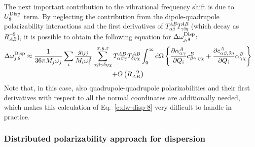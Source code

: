 \documentclass[a4paper,titlepage,twoside,fleqn,12pt]{book}
\newcommand{\fderiv}[2]{\ensuremath{
\frac{\partial #1}{\partial #2}}}
\begin{document}
\begin{refsection}
The next important contribution to the vibrational frequency 
shift is due to $U_{8}^{\rm Disp}$ term. By neglecting the 
contribution from the dipole\hyp{}quadrupole polarizability 
interactions and the first derivatives of $T^{AB}_{\alpha\beta}T^{AB}_{\gamma\delta\eta}$ 
(which decay as $R^{-9}_{AB}$), it is possible to obtain 
the following equation for $\Delta \omega_{j,8}^{\rm Disp}$: 
%
\begin{multline} \label{e:dw-disp-8}
 \Delta\omega_{j,8}^{\rm Disp} \approx 
\frac{1}{36\pi M_j\omega_j}\sum_i \frac{g_{ijj}}{M_i\omega_i^2} 
\sum_{\alpha\beta\gamma\delta\eta\chi}^{x,y,z}   
T^{AB}_{\alpha\beta\gamma}T^{AB}_{\delta\eta\chi}
%
\int_{0}^{\infty} {\rm d}\Omega
 \left\{
\frac{\partial \alpha_{\alpha\gamma}^{A}}{\partial Q_i} c^{B}_{\beta\gamma,\eta\chi}
+
\fderiv{c^{A}_{\alpha\beta,\delta\eta}}{Q_i} \alpha^B_{\gamma\chi}
\right\}  \\
+ O\left( R^{-9}_{AB}\right)
\end{multline}
%
Note that, in this case, also quadrupole\hyp{}quadrupole 
polarizabilities and their first derivatives with respect 
to all the normal coordinates are additionally needed, 
which makes this calculation of Eq.~\eqref{e:dw-disp-8} 
very difficult to handle in practice. 

\subsubsection{Distributed polarizability approach for dispersion}


\end{refsection}
\end{document}

